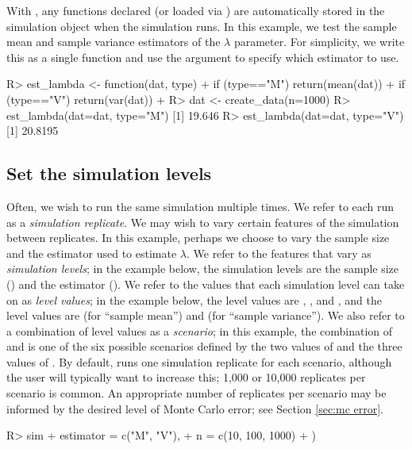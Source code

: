 With , any functions declared (or loaded via ) are automatically stored in the simulation object when the simulation runs. In this example, we test the sample mean and sample variance estimators of the $\lambda$ parameter. For simplicity, we write this as a single function and use the  argument to specify which estimator to use.

\begin{example}
R> est_lambda <- function(dat, type) {
+    if (type=="M") { return(mean(dat)) }
+    if (type=="V") { return(var(dat)) }
+  }
R> dat <- create_data(n=1000)
R> est_lambda(dat=dat, type="M")
[1] 19.646
R> est_lambda(dat=dat, type="V")
[1] 20.8195
\end{example}

\subsection{Set the simulation levels}

Often, we wish to run the same simulation multiple times. We refer to each run as a \textit{simulation replicate}. We may wish to vary certain features of the simulation between replicates. In this example, perhaps we choose to vary the sample size and the estimator used to estimate $\lambda$. We refer to the features that vary as \textit{simulation levels}; in the example below, the simulation levels are the sample size () and the estimator (). We refer to the values that each simulation level can take on as \textit{level values}; in the example below, the  level values are , , and , and the  level values are  (for ``sample mean'') and  (for ``sample variance''). We also refer to a combination of level values as a \textit{scenario}; in this example, the combination of  and  is one of the six possible scenarios defined by the two values of  and the three values of . By default,  runs one simulation replicate for each scenario, although the user will typically want to increase this; 1,000 or 10,000 replicates per scenario is common. An appropriate number of replicates per scenario may be informed by the desired level of Monte Carlo error; see Section \ref{sec:mc error}.

\begin{example}
R> sim %
+    estimator = c("M", "V"),
+    n = c(10, 100, 1000)
+  )
\end{example}

